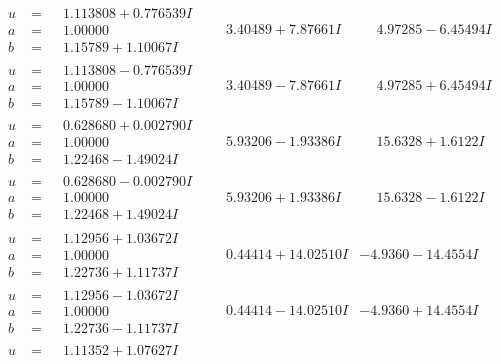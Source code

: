 \documentclass[1p]{elsarticle_modified}
\theoremstyle{definition}
\begin{document}
$$\begin{array}{c|c|c}
\begin{aligned}
u &= \phantom{-}1.113808 + 0.776539 I \\
a &= \phantom{-}1.00000\phantom{ +0.000000I} \\
b &= \phantom{-}1.15789 + 1.10067 I\end{aligned}
 & \phantom{-}3.40489 + 7.87661 I & \phantom{-}4.97285 - 6.45494 I \\ \hline\begin{aligned}
u &= \phantom{-}1.113808 - 0.776539 I \\
a &= \phantom{-}1.00000\phantom{ +0.000000I} \\
b &= \phantom{-}1.15789 - 1.10067 I\end{aligned}
 & \phantom{-}3.40489 - 7.87661 I & \phantom{-}4.97285 + 6.45494 I \\ \hline\begin{aligned}
u &= \phantom{-}0.628680 + 0.002790 I \\
a &= \phantom{-}1.00000\phantom{ +0.000000I} \\
b &= \phantom{-}1.22468 - 1.49024 I\end{aligned}
 & \phantom{-}5.93206 - 1.93386 I & \phantom{-}15.6328 + 1.6122 I \\ \hline\begin{aligned}
u &= \phantom{-}0.628680 - 0.002790 I \\
a &= \phantom{-}1.00000\phantom{ +0.000000I} \\
b &= \phantom{-}1.22468 + 1.49024 I\end{aligned}
 & \phantom{-}5.93206 + 1.93386 I & \phantom{-}15.6328 - 1.6122 I \\ \hline\begin{aligned}
u &= \phantom{-}1.12956 + 1.03672 I \\
a &= \phantom{-}1.00000\phantom{ +0.000000I} \\
b &= \phantom{-}1.22736 + 1.11737 I\end{aligned}
 & \phantom{-}0.44414 + 14.02510 I & -4.9360 - 14.4554 I \\ \hline\begin{aligned}
u &= \phantom{-}1.12956 - 1.03672 I \\
a &= \phantom{-}1.00000\phantom{ +0.000000I} \\
b &= \phantom{-}1.22736 - 1.11737 I\end{aligned}
 & \phantom{-}0.44414 - 14.02510 I & -4.9360 + 14.4554 I \\ \hline\begin{aligned}
u &= \phantom{-}1.11352 + 1.07627 I \\

\end{aligned}
\end{array}$$
\end{document}
